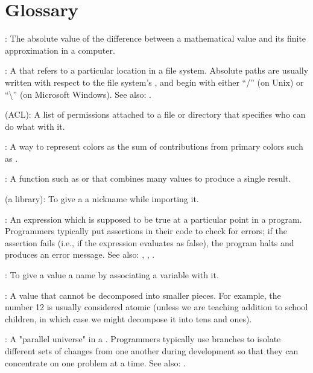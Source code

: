 \chapter{Glossary}\label{s:gloss}

:
The absolute value of the difference between a mathematical value
and its finite approximation in a computer.

:
A  that refers to a
particular location in a file system. Absolute paths are usually written
with respect to the file system's , and begin with either ``/'' (on Unix) or
``\textbackslash{}'' (on Microsoft Windows). See also:
.

 (ACL):
A list of permissions attached to a file or directory
that specifies who can do what with it.

:
A way to represent colors as the sum of
contributions from primary colors such as .

:
A function such as  or
 that combines many values to produce a single result.

 (a library):
To give a  a
nickname while importing it.

:
An expression which is supposed to be true at a
particular point in a program. Programmers typically put assertions in
their code to check for errors; if the assertion fails (i.e., if the
expression evaluates as false), the program halts and produces an error
message. See also: ,
,
.

:
To give a value a name by associating a variable
with it.

:
A value that cannot be decomposed into smaller
pieces. For example, the number 12 is usually considered atomic (unless
we are teaching addition to school children, in which case we might
decompose it into tens and ones).

:
A "parallel universe" in a  .
Programmers typically use branches to isolate different sets of changes from one another during development
so that they can concentrate on one problem at a time.
See also: .


